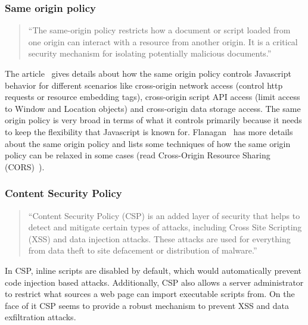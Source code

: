 \subsubsection{Same origin policy}

\begin{quotation}
  ``The same-origin policy restricts how a document or script loaded from one origin
  can interact with a resource from another origin. It is a critical security mechanism
  for isolating potentially malicious documents.''~\cite{sameOrigin}
\end{quotation}
The article~\cite{sameOrigin} gives details about how the same origin policy controls
Javascript behavior for different scenarios like cross-origin network access (control
http requests or resource embedding tags), cross-origin script API access (limit
access to Window and Location objects) and cross-origin data storage access. The
same origin policy is very broad in terms of what it controls primarily because it
needs to keep the flexibility that Javascript is known for. Flanagan~\cite[Section~13.6.2]{flanagan2011javascript}
has more details about the same origin policy and lists some techniques of how the
same origin policy can be relaxed in some cases (read Cross-Origin Resource Sharing
(CORS)~\cite{CORS}).

\subsubsection{Content Security Policy}

\begin{quotation}
``Content Security Policy (CSP) is an added layer of security that helps to detect
and mitigate certain types of attacks, including Cross Site Scripting (XSS) and
data injection attacks. These attacks are used for everything from data theft to
site defacement or distribution of malware.''~\cite{csp}
\end{quotation}
In CSP, inline scripts are disabled by default, which would automatically prevent
code injection based attacks. Additionally, CSP also allows a server administrator
to restrict what sources a web page can import executable scripts from. On the face
of it CSP seems to provide a robust mechanism to prevent XSS and data exfiltration
attacks.

